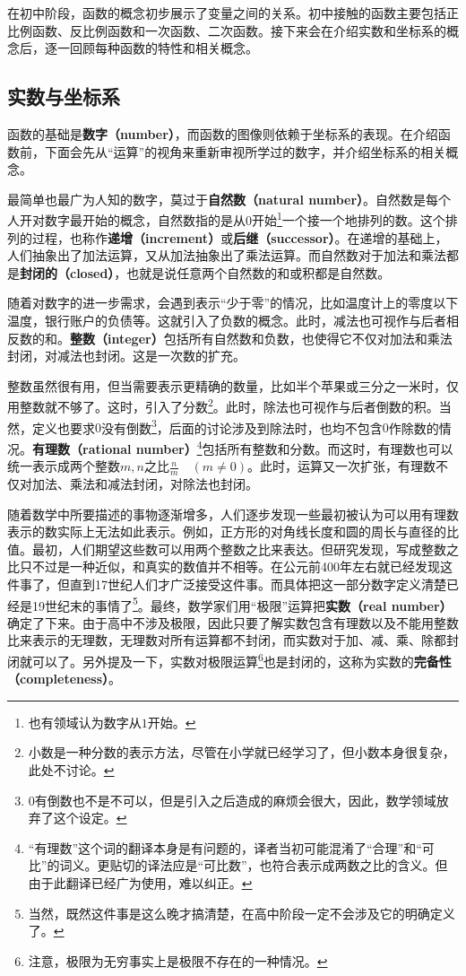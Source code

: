 
\begin{issues}
\issueDraft
\end{issues}

在初中阶段，函数的概念初步展示了变量之间的关系。初中接触的函数主要包括正比例函数、反比例函数和一次函数、二次函数。接下来会在介绍实数和坐标系的概念后，逐一回顾每种函数的特性和相关概念。

\subsection{实数与坐标系}

函数的基础是\textbf{数字（number）}，而函数的图像则依赖于坐标系的表现。在介绍函数前，下面会先从“运算”的视角来重新审视所学过的数字，并介绍坐标系的相关概念。

最简单也最广为人知的数字，莫过于\textbf{自然数（natural number）}。自然数是每个人开对数字最开始的概念，自然数指的是从$0$开始\footnote{也有领域认为数字从$1$开始。}一个接一个地排列的数。这个排列的过程，也称作\textbf{递增（increment）}或\textbf{后继（successor）}。在递增的基础上，人们抽象出了加法运算，又从加法抽象出了乘法运算。而自然数对于加法和乘法都是\textbf{封闭的（closed）}，也就是说任意两个自然数的和或积都是自然数。

随着对数字的进一步需求，会遇到表示“少于零”的情况，比如温度计上的零度以下温度，银行账户的负债等。这就引入了负数的概念。此时，减法也可视作与后者相反数的和。\textbf{整数（integer）}包括所有自然数和负数，也使得它不仅对加法和乘法封闭，对减法也封闭。这是一次数的扩充。

整数虽然很有用，但当需要表示更精确的数量，比如半个苹果或三分之一米时，仅用整数就不够了。这时，引入了分数\footnote{小数是一种分数的表示方法，尽管在小学就已经学习了，但小数本身很复杂，此处不讨论。}。此时，除法也可视作与后者倒数的积。当然，定义也要求$0$没有倒数\footnote{$0$有倒数也不是不可以，但是引入之后造成的麻烦会很大，因此，数学领域放弃了这个设定。}，后面的讨论涉及到除法时，也均不包含$0$作除数的情况。\textbf{有理数（rational number）}\footnote{“有理数”这个词的翻译本身是有问题的，译者当初可能混淆了“合理”和“可比”的词义。更贴切的译法应是“可比数”，也符合表示成两数之比的含义。但由于此翻译已经广为使用，难以纠正。}包括所有整数和分数。而这时，有理数也可以统一表示成两个整数$m,n$之比$\displaystyle\frac{n}{m}\quad(m \neq 0)$。此时，运算又一次扩张，有理数不仅对加法、乘法和减法封闭，对除法也封闭。

随着数学中所要描述的事物逐渐增多，人们逐步发现一些最初被认为可以用有理数表示的数实际上无法如此表示。例如，正方形的对角线长度和圆的周长与直径的比值。最初，人们期望这些数可以用两个整数之比来表达。但研究发现，写成整数之比只不过是一种近似，和真实的数值并不相等。在公元前400年左右就已经发现这件事了，但直到17世纪人们才广泛接受这件事。而具体把这一部分数字定义清楚已经是19世纪末的事情了\footnote{当然，既然这件事是这么晚才搞清楚，在高中阶段一定不会涉及它的明确定义了。}。最终，数学家们用“极限”运算把\textbf{实数（real number）}确定了下来。由于高中不涉及极限，因此只要了解实数包含有理数以及不能用整数比来表示的无理数，无理数对所有运算都不封闭，而实数对于加、减、乘、除都封闭就可以了。另外提及一下，实数对极限运算\footnote{注意，极限为无穷事实上是极限不存在的一种情况。}也是封闭的，这称为实数的\textbf{完备性（completeness）}。

